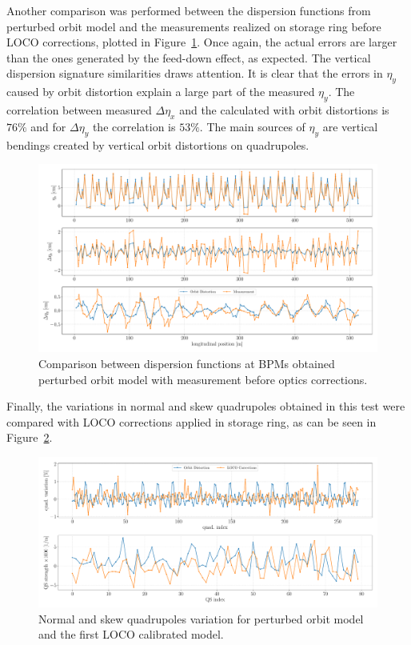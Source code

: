 Another comparison was performed between the dispersion functions from perturbed orbit model and the measurements realized on storage ring before LOCO corrections, plotted in Figure~\ref{fig:disperson_orb}. Once again, the actual errors are larger than the ones generated by the feed-down effect, as expected. The vertical dispersion signature similarities draws attention. It is clear that the errors in $\eta_y$ caused by orbit distortion explain a large part of the measured $\eta_y$. The correlation between measured $\Delta\eta_x$ and the calculated with orbit distortions is $76\%$ and for $\Delta\eta_y$ the correlation is $53\%$. The main sources of $\eta_y$ are vertical bendings created by vertical orbit distortions on quadrupoles.
\begin{figure}
\centering
\includegraphics[width=1.0\textwidth]{figures/dispersion_orbit_iter0.pdf}
\caption{Comparison between dispersion functions at BPMs obtained perturbed orbit model with measurement before optics corrections.}
\label{fig:disperson_orb}
\end{figure}

Finally, the variations in normal and skew quadrupoles obtained in this test were compared with LOCO corrections applied in storage ring, as can be seen in Figure~\ref{fig:corrections_orb}.
\begin{figure}
\centering
\includegraphics[width=1.0\textwidth]{figures/corrections_orb_residue_loco_iter0.pdf}
\caption{Normal and skew quadrupoles variation for perturbed orbit model and the first LOCO calibrated model.}
\label{fig:corrections_orb}
\end{figure}

